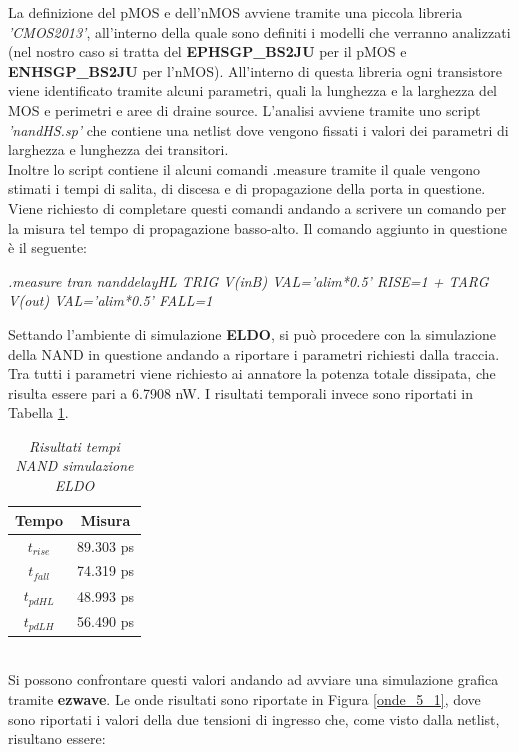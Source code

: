 La definizione del pMOS e dell'nMOS avviene tramite una piccola libreria \textit{'CMOS2013'}, all'interno della quale sono definiti i modelli che verranno analizzati (nel nostro caso si tratta del \textbf{EPHSGP\_BS2JU} per il pMOS e \textbf{ENHSGP\_BS2JU} per l'nMOS). All'interno di questa libreria ogni transistore viene identificato tramite alcuni parametri, quali la lunghezza e la larghezza del MOS e perimetri e aree di draine source.
L'analisi avviene tramite uno script \textit{'nandHS.sp'} che contiene una netlist dove vengono fissati i valori dei parametri di larghezza e lunghezza dei transitori.\\
Inoltre lo script contiene il alcuni comandi .measure tramite il quale vengono stimati i tempi di salita, di discesa e di propagazione della porta in questione. Viene richiesto di completare questi comandi andando a scrivere un comando per la misura tel tempo di propagazione basso-alto. Il comando aggiunto in questione è il seguente:
\begin{center}
\textit{.measure tran nanddelayHL TRIG V(inB) VAL='alim*0.5' RISE=1 
+ TARG V(out) VAL='alim*0.5' FALL=1}
\end{center}
Settando l'ambiente di simulazione \textbf{ELDO}, si può procedere con la simulazione della NAND in questione andando a riportare i parametri richiesti dalla traccia. Tra tutti i parametri viene richiesto ai annatore la potenza totale dissipata, che risulta essere pari a 6.7908 nW. I risultati temporali invece sono riportati in Tabella \ref{Tab5_1}.\\
\begin{table}[!h]\footnotesize
	\centering
	\begin{tabular}{|c|c|}
		\hline
		\textbf{Tempo} & \textbf{Misura}\\
		\hline
		$t_{rise}$ & 89.303 ps\\
		$t_{fall}$ & 74.319 ps\\
		$t_{pdHL}$ & 48.993 ps\\
		$t_{pdLH}$ & 56.490 ps\\
		\hline
	\end{tabular}
	\caption{\textit{Risultati tempi NAND simulazione ELDO}}
	\label{Tab5_1}
\end{table}
\\
Si possono confrontare questi valori andando ad avviare una simulazione grafica tramite \textbf{ezwave}. Le onde risultati sono riportate in Figura \ref{onde_5_1}, dove sono riportati i valori della due tensioni di ingresso che, come visto dalla netlist, risultano essere:

